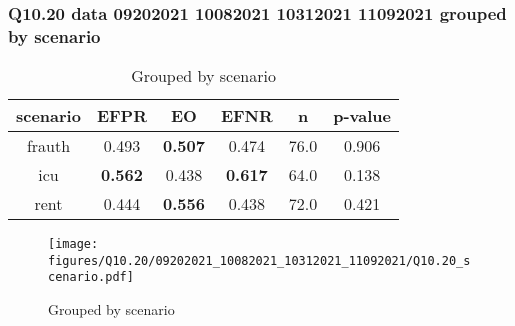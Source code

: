 \subsubsection{Q10.20 data 09202021 10082021 10312021 11092021 grouped by scenario}

\begin{comment}
               EFPR        EO      EFNR     n    pvalue
(frauth,)  0.493421  0.506579  0.473684  76.0  0.906042
(icu,)     0.562500  0.437500  0.617188  64.0  0.138333
(rent,)    0.444444  0.555556  0.437500  72.0  0.420925
\end{comment}

\begin{table}[h]
    \centering
    \begin{tabular}{|c|c|c|c|c|c|}
        \hline
        scenario & EFPR & EO & EFNR & n & p-value\\
        \hline
        frauth & 0.493 & \textbf{0.507} & 0.474 & 76.0 & 0.906\\
		icu & \textbf{0.562} & 0.438 & \textbf{0.617} & 64.0 & 0.138\\
		rent & 0.444 & \textbf{0.556} & 0.438 & 72.0 & 0.421\\
		
        \hline
    \end{tabular}
    \caption{Grouped by scenario}
    \label{tab:my_label}
\end{table}
\begin{figure}[h]
    \centering
    \texttt{[image: figures/Q10.20/09202021\_10082021\_10312021\_11092021/Q10.20\_scenario.pdf]}
    \caption{Grouped by scenario}
    \label{fig:my_label}
\end{figure}
